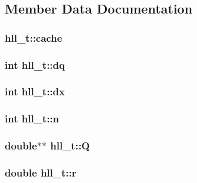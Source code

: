 \subsection{Member Data Documentation}
\hypertarget{structhll__t_a32ffadd7c65ddc2b45e0fa2c990d6f0d}{
\subsubsection[{cache}]{ {\bf hll\_\-t::cache}}}
\label{structhll__t_a32ffadd7c65ddc2b45e0fa2c990d6f0d}
\hypertarget{structhll__t_a95b55bdf1e30483285b054d10800339a}{
\subsubsection[{dq}]{\setlength{\rightskip}{0pt plus 5cm}int {\bf hll\_\-t::dq}}}
\label{structhll__t_a95b55bdf1e30483285b054d10800339a}
\hypertarget{structhll__t_ad46b79e35272e8be8a221ae05f167ac7}{
\subsubsection[{dx}]{\setlength{\rightskip}{0pt plus 5cm}int {\bf hll\_\-t::dx}}}
\label{structhll__t_ad46b79e35272e8be8a221ae05f167ac7}
\hypertarget{structhll__t_af056cebead3545d72c6cbfd1998fe36c}{
\subsubsection[{n}]{\setlength{\rightskip}{0pt plus 5cm}int {\bf hll\_\-t::n}}}
\label{structhll__t_af056cebead3545d72c6cbfd1998fe36c}
\hypertarget{structhll__t_a943151772582e3585ec2658fd3985220}{
\subsubsection[{Q}]{\setlength{\rightskip}{0pt plus 5cm}double$\ast$$\ast$ {\bf hll\_\-t::Q}}}
\label{structhll__t_a943151772582e3585ec2658fd3985220}
\hypertarget{structhll__t_ac5c63b436a9f5afb3b7887297a053a8b}{
\subsubsection[{r}]{\setlength{\rightskip}{0pt plus 5cm}double {\bf hll\_\-t::r}}}
